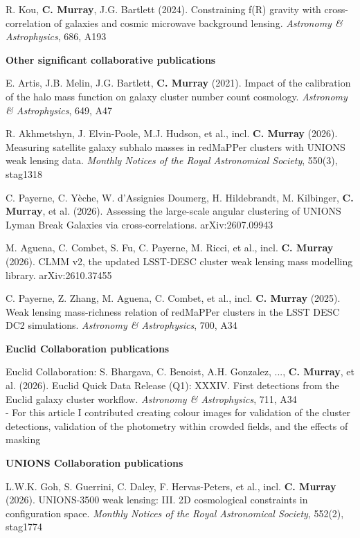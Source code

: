 \documentclass[11pt]{article}
\begin{document}
R. Kou, \textbf{C. Murray}, J.G. Bartlett (2024). Constraining f(R) gravity with cross-correlation of galaxies and cosmic microwave background lensing. \textit{Astronomy \& Astrophysics}, 686, A193

\textbf{Other significant collaborative publications}

\nopagebreak
E. Artis, J.B. Melin, J.G. Bartlett, \textbf{C. Murray} (2021). Impact of the calibration of the halo mass function on galaxy cluster number count cosmology. \textit{Astronomy \& Astrophysics}, 649, A47

R. Akhmetshyn, J. Elvin-Poole, M.J. Hudson, et al., incl. \textbf{C. Murray} (2026). Measuring satellite galaxy subhalo masses in redMaPPer clusters with UNIONS weak lensing data. \textit{Monthly Notices of the Royal Astronomical Society}, 550(3), stag1318

C. Payerne, C. Y\`eche, W. d'Assignies Doumerg, H. Hildebrandt, M. Kilbinger, \textbf{C. Murray}, et al. (2026). Assessing the large-scale angular clustering of UNIONS Lyman Break Galaxies via cross-correlations. arXiv:2607.09943

M. Aguena, C. Combet, S. Fu, C. Payerne, M. Ricci, et al., incl. \textbf{C. Murray} (2026). CLMM v2, the updated LSST-DESC cluster weak lensing mass modelling library. arXiv:2610.37455

C. Payerne, Z. Zhang, M. Aguena, C. Combet, et al., incl. \textbf{C. Murray} (2025). Weak lensing mass-richness relation of redMaPPer clusters in the LSST DESC DC2 simulations. \textit{Astronomy \& Astrophysics}, 700, A34

\textbf{Euclid Collaboration publications}

\nopagebreak
Euclid Collaboration: S. Bhargava, C. Benoist, A.H. Gonzalez, ..., \textbf{C. Murray}, et al. (2026). Euclid Quick Data Release (Q1): XXXIV. First detections from the Euclid galaxy cluster workflow. \textit{Astronomy \& Astrophysics}, 711, A34 \\
- For this article I contributed creating colour images for validation of the cluster detections, validation of the photometry within crowded fields, and the effects of masking

\textbf{UNIONS Collaboration publications}

\nopagebreak
L.W.K. Goh, S. Guerrini, C. Daley, F. Hervas-Peters, et al., incl. \textbf{C. Murray} (2026). UNIONS-3500 weak lensing: III. 2D cosmological constraints in configuration space. \textit{Monthly Notices of the Royal Astronomical Society}, 552(2), stag1774
\end{document}
